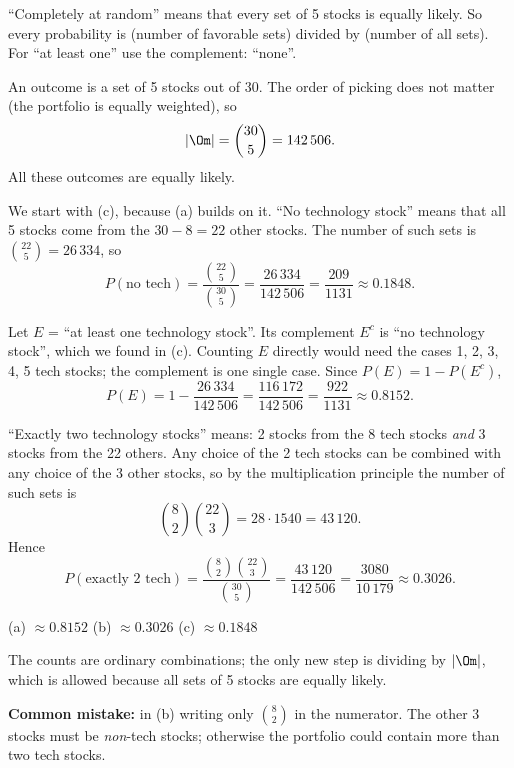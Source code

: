 \begin{solution}
	\idea ``Completely at random'' means that every set of 5 stocks is equally
	likely. So every probability is (number of favorable sets) divided by
	(number of all sets). For ``at least one'' use the complement: ``none''.

	 An outcome is a set of 5 stocks out of 30. The order of
	picking does not matter (the portfolio is equally weighted), so
	\[ |\Om|=\binom{30}{5}=142\,506. \]
	All these outcomes are equally likely.

	 We start with (c), because (a) builds on it. ``No technology
	stock'' means that all 5 stocks come from the $30-8=22$ other stocks. The
	number of such sets is $\binom{22}{5}=26\,334$, so
	\[ P(\text{no tech})=\frac{\binom{22}{5}}{\binom{30}{5}}
		=\frac{26\,334}{142\,506}=\frac{209}{1131}\approx0.1848. \]

	 Let $E$ = ``at least one technology stock''. Its complement
	$E^c$ is ``no technology stock'', which we found in (c). Counting $E$
	directly would need the cases 1, 2, 3, 4, 5 tech stocks; the complement is
	one single case. Since $P(E)=1-P(E^c)$,
	\[ P(E)=1-\frac{26\,334}{142\,506}=\frac{116\,172}{142\,506}=\frac{922}{1131}
		\approx0.8152. \]

	 ``Exactly two technology stocks'' means: 2 stocks from the 8
	tech stocks \emph{and} 3 stocks from the 22 others. Any choice of the 2
	tech stocks can be combined with any choice of the 3 other stocks, so by
	the multiplication principle the
	number of such sets is
	\[ \binom{8}{2}\binom{22}{3}=28\cdot1540=43\,120. \]
	Hence
	\[ P(\text{exactly 2 tech})=\frac{\binom{8}{2}\binom{22}{3}}{\binom{30}{5}}
		=\frac{43\,120}{142\,506}=\frac{3080}{10\,179}\approx0.3026. \]

	\begin{answer}
		(a) $\approx0.8152$ \quad (b) $\approx0.3026$ \quad (c) $\approx0.1848$
	\end{answer}
	\begin{remark}
		The counts are ordinary combinations; the only new step is dividing by
		$|\Om|$, which is allowed because all sets of 5 stocks are equally
		likely.

		\textbf{Common mistake:} in (b) writing only $\binom{8}{2}$ in the
		numerator. The other 3 stocks must be \emph{non}-tech stocks; otherwise
		the portfolio could contain more than two tech stocks.
	\end{remark}
\end{solution}
